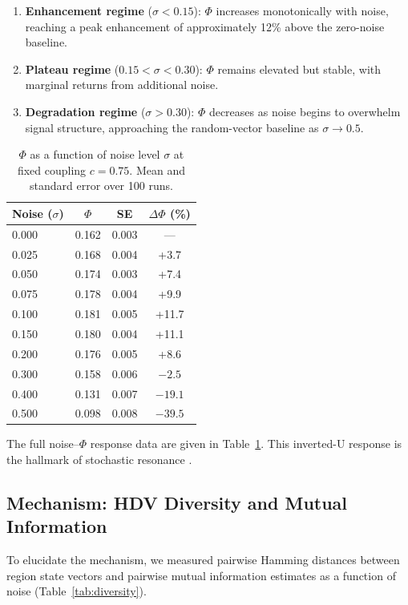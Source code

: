\documentclass[12pt,a4paper]{article}
\begin{document}
\begin{enumerate}
    \item \textbf{Enhancement regime} ($\sigma < 0.15$): $\Phi$ increases monotonically with noise, reaching a peak enhancement of approximately 12\% above the zero-noise baseline.
    \item \textbf{Plateau regime} ($0.15 < \sigma < 0.30$): $\Phi$ remains elevated but stable, with marginal returns from additional noise.
    \item \textbf{Degradation regime} ($\sigma > 0.30$): $\Phi$ decreases as noise begins to overwhelm signal structure, approaching the random-vector baseline as $\sigma \to 0.5$.
\end{enumerate}

\begin{table}[H]
\centering
\caption{$\Phi$ as a function of noise level $\sigma$ at fixed coupling $c = 0.75$. Mean and standard error over 100 runs.}
\label{tab:noise-response}
\begin{tabular}{lccc}
\toprule
\textbf{Noise ($\sigma$)} & \textbf{$\Phi$} & \textbf{SE} & \textbf{$\Delta\Phi$ (\%)} \\
\midrule
0.000 & 0.162 & 0.003 & --- \\
0.025 & 0.168 & 0.004 & +3.7 \\
0.050 & 0.174 & 0.003 & +7.4 \\
0.075 & 0.178 & 0.004 & +9.9 \\
0.100 & 0.181 & 0.005 & +11.7 \\
0.150 & 0.180 & 0.004 & +11.1 \\
0.200 & 0.176 & 0.005 & +8.6 \\
0.300 & 0.158 & 0.006 & $-2.5$ \\
0.400 & 0.131 & 0.007 & $-19.1$ \\
0.500 & 0.098 & 0.008 & $-39.5$ \\
\bottomrule
\end{tabular}
\end{table}

The full noise--$\Phi$ response data are given in Table~\ref{tab:noise-response}. This inverted-U response is the hallmark of stochastic resonance \citep{gammaitoni1998stochastic}.

\subsection{Mechanism: HDV Diversity and Mutual Information}

To elucidate the mechanism, we measured pairwise Hamming distances between region state vectors and pairwise mutual information estimates as a function of noise (Table~\ref{tab:diversity}).
\end{document}
